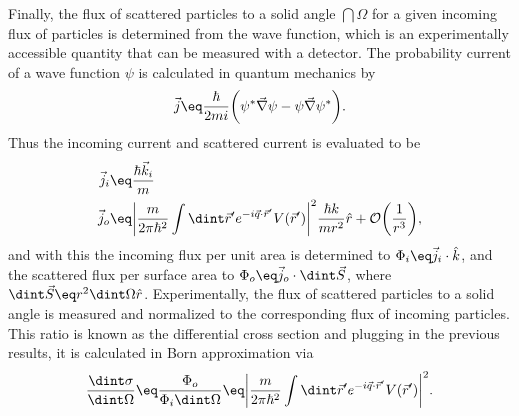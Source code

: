 \documentclass[\main/dresen_thesis.tex]{subfiles}
\begin{document}
Finally, the flux of scattered particles to a solid angle $\dint \Omega$ for a given incoming flux of particles is determined from the wave function, which is an experimentally accessible quantity that can be measured with a detector.
The probability current of a wave function $\psi$  is calculated in quantum mechanics by
\begin{align}
  \vec{j} \eq \frac{\hbar}{2mi} \bigg( \psi^* \vec{\nabla} \psi - \psi \vec{\nabla} \psi^* \bigg).
\end{align}
Thus the incoming current and scattered current is evaluated to be
\begin{align}
  \vec{j}_i &\eq \frac{\hbar \vec{k}_i}{m}\\
  \vec{j}_o &\eq \bigg| \frac{m}{2 \pi\hbar^2} \int \dint \vec{r}^\prime e^{-i\vec{q} \cdot \vec{r}^\prime} V (\vec{r}^\prime) \bigg|^2 \frac{\hbar k}{m r^2} \hat{r} + \mathcal{O} \bigg(\frac{1}{r^3}\bigg),\\
\end{align}
and with this the incoming flux per unit area is determined to $\Phi_i \eq \vec{j}_i \cdot \hat{k}$, and the scattered flux per surface area to $\Phi_o \eq \vec{j}_o \cdot \dint \vec{S}$, where $\dint \vec{S} \eq r^2 \dint \Omega \hat{r}$.
Experimentally, the flux of scattered particles to a solid angle is measured and normalized to the corresponding flux of incoming particles. This ratio is known as the differential cross section and plugging in the previous results, it is calculated in Born approximation via
\begin{align}
  \frac{\dint \sigma}{\dint \Omega} \eq \frac{\Phi_o}{\Phi_i \dint \Omega} \eq \bigg| \frac{m}{2 \pi\hbar^2} \int \dint \vec{r}^\prime e^{-i\vec{q} \cdot \vec{r}^\prime} V (\vec{r}^\prime) \bigg|^2.\label{eq:theoreticalBackground:scattering:scatteringTheory:differentialCrossSectionIntegralOverPotential}
\end{align}
\end{document}
